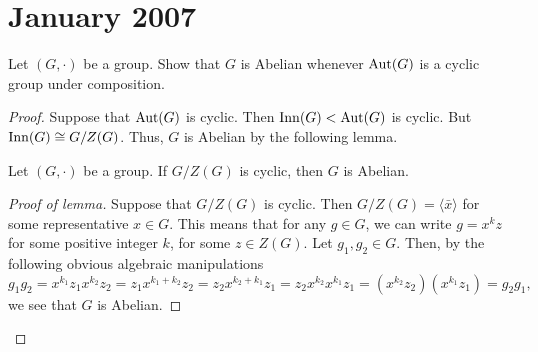 \chapter{January 2007}
\begin{problem}
Let $(G,\cdot)$  be a group. Show that $G$ is Abelian whenever $\operatorname{Aut}(G)$ is
a cyclic group under composition.
\end{problem}
\begin{proof}
Suppose that $\operatorname{Aut}(G)$ is cyclic. Then $\operatorname{Inn}(G)<\operatorname{Aut}(G)$ is cyclic. But
$\operatorname{Inn}(G)\cong G/Z(G)$. Thus, $G$ is Abelian by the following lemma.
\begin{lemma}
Let $(G,\cdot)$ be a group. If $G/Z(G)$ is cyclic, then $G$ is Abelian.
\end{lemma}
\begin{proof}[Proof of lemma]
\renewcommand\qedsymbol{$\clubsuit$}
Suppose that $G/Z(G)$ is cyclic. Then $G/Z(G)=\langle \bar x \rangle$ for
some representative $x\in G$. This means that for any $g\in G$, we can
write $g=x^kz$ for some positive integer $k$, for some $z\in Z(G)$. Let
$g_1,g_2\in G$. Then, by the following obvious algebraic manipulations
\[
g_1g_2=x^{k_1}z_1x^{k_2}z_2=z_1x^{k_1+k_2}z_2=z_2x^{k_2+k_1}z_1=z_2x^{k_2}x^{k_1}z_1=(x^{k_2}z_2)(x^{k_1}z_1)=g_2g_1,
\]
we see that $G$ is Abelian.
\end{proof}
\end{proof}

